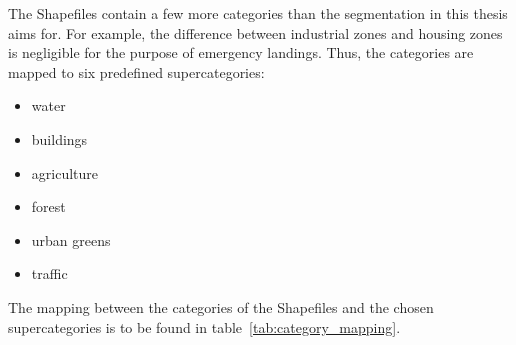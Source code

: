 The Shapefiles contain a few more categories than the segmentation in this thesis aims for. For example, the difference between industrial zones and housing zones is negligible for the purpose of emergency landings. Thus, the categories are mapped to six predefined supercategories:
\begin{itemize}
  \setlength\itemsep{1mm}
  \item water
  \item buildings
  \item agriculture
  \item forest
  \item urban greens
  \item traffic
\end{itemize}
The mapping between the categories of the Shapefiles and the chosen supercategories is to be found in table~\ref{tab:category_mapping}.

